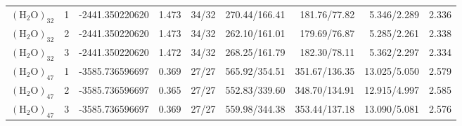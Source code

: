 \begin{table}[p]
{\begin{tabular}{llrrrrrrr}
\addlinespace
$(\mathrm{H_2O})_{32}$ & 1 & -2441.350220620 & 1.473 & 34/32 & 270.44/166.41 & 181.76/77.82 & 5.346/2.289 & 2.336 \\
$(\mathrm{H_2O})_{32}$ & 2 & -2441.350220620 & 1.473 & 34/32 & 262.10/161.01 & 179.69/76.87 & 5.285/2.261 & 2.338 \\
$(\mathrm{H_2O})_{32}$ & 3 & -2441.350220620 & 1.472 & 34/32 & 268.25/161.79 & 182.30/78.11 & 5.362/2.297 & 2.334 \\
\addlinespace
$(\mathrm{H_2O})_{47}$ & 1 & -3585.736596697 & 0.369 & 27/27 & 565.92/354.51 & 351.67/136.35 & 13.025/5.050 & 2.579 \\
$(\mathrm{H_2O})_{47}$ & 2 & -3585.736596697 & 0.365 & 27/27 & 552.83/339.60 & 348.70/134.91 & 12.915/4.997 & 2.585 \\
$(\mathrm{H_2O})_{47}$ & 3 & -3585.736596697 & 0.369 & 27/27 & 559.98/344.38 & 353.44/137.18 & 13.090/5.081 & 2.576 \\
\bottomrule
\end{tabular}%
}
\end{table}

